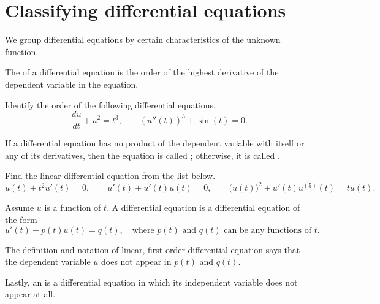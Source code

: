 \documentclass[../main.tex]{subfiles}
\begin{document}
 \section{Classifying differential equations}

We group differential equations by certain characteristics of the unknown function.

\begin{definition}[order] \label{def:de-order}
The  of a differential equation is the order of the highest derivative of the dependent variable in the equation.
\end{definition}
\begin{example} \label{ex:de-identify-order}
  Identify the order of the following differential equations.
  \[
    \frac{du}{dt} + u^{2} = t^{3}, 
    \qquad
    \left(u''(t)\right)^{3} + \sin(t) = 0.
  \]

\end{example}

\begin{definition} \label{def:de-linear}
  If a differential equation has no product of the dependent variable with itself or any of its derivatives, then the equation is called ; otherwise, it is called . 
\end{definition}
\begin{example} \label{ex:de-identify-linear}
  Find the linear differential equation from the list below.
  \[
    u(t) + t^{2} u'(t) = 0,
    \qquad
    u'(t) + u'(t) u(t) = 0,
    \qquad
    \big(u(t)\big)^{2} + u'(t) u^{(5)}(t) = t u(t).
  \]

\end{example}

\begin{definition} \label{def:de-linear-first-order}
  Assume \(u\) is a function of \(t\). A  differential equation  is a differential equation of the form
  \[
    u'(t) + p(t) u(t) = q(t), \quad\text{where \(p(t)\) and \(q(t)\) can be any functions of \(t\)}.
  \]
\end{definition}

\faExclamationTriangle{} The definition and notation of linear, first-order differential equation says that the dependent variable \(u\) does not appear in \(p(t)\) and \(q(t)\).

\label{def:autonomous}
Lastly, an  is a differential equation in which its independent variable does not appear at all. 

\end{document}
